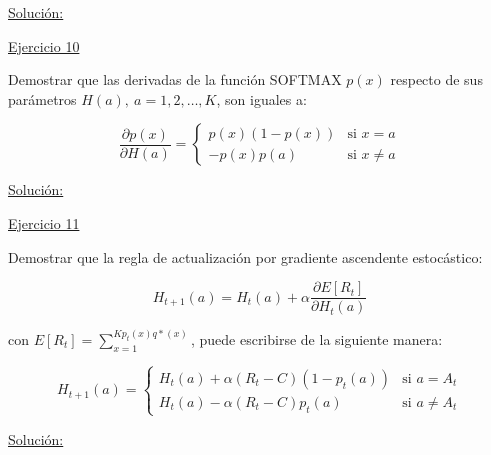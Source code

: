 \documentclass[12pt]{article}
\newlength\tindent
\renewcommand{\indent}{\hspace*{\tindent}}
\begin{document}
    \indent\underline{Solución:}

    \indent\underline{Ejercicio 10}

    Demostrar que las derivadas de la función SOFTMAX $p(x)$ respecto de sus parámetros $H(a),\ a=1,2,\dots,K$, son iguales a:

    \[
        \frac{\partial p(x)}{\partial H(a)} =
        \begin{cases}
            p(x)(1-p(x))    &\text{si $x = a$} \\
            -p(x)p(a)       &\text{si $x\neq a$}
        \end{cases}
    \]

    \indent\underline{Solución:}

    \indent\underline{Ejercicio 11}

    Demostrar que la regla de actualización por gradiente ascendente estocástico:

    \[H_{t+1}(a) = H_t (a) + \alpha \frac{\partial E[R_t] }{\partial H_t(a)}\]

    con $E[R_t] = \sum_{x=1}^{K p_t(x)q*(x)}$, puede escribirse de la siguiente manera:

    \[
        H_{t+1}(a) =
        \begin{cases}
            H_t (a) + \alpha (R_t - C)(1-p_t(a))    &\text{si $a = A_t$} \\
            H_t (a) - \alpha (R_t - C)p_t(a)        &\text{si $a \neq A_t$}
        \end{cases}
    \]

    \indent\underline{Solución:}
\end{document}
